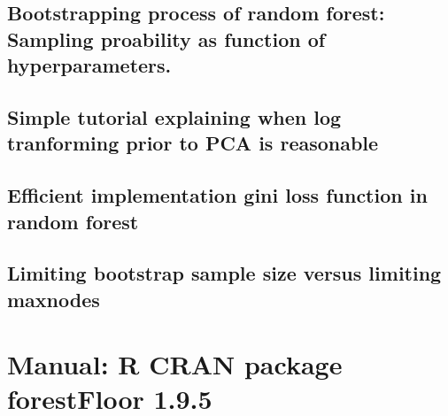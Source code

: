 \subsection{Bootstrapping process of random forest: Sampling proability as function of hyperparameters.}

\label{CV9_RFsampling}

\subsection{Simple tutorial explaining when log tranforming prior to PCA is reasonable}

\label{CV10_PCAlogTransform}

\subsection{Efficient implementation gini loss function in random forest}

\label{CV11_RFginigain}

\subsection{Limiting bootstrap sample size versus limiting maxnodes}

\label{CV12_RFsampsize}





\section{Manual: R CRAN package forestFloor 1.9.5}



